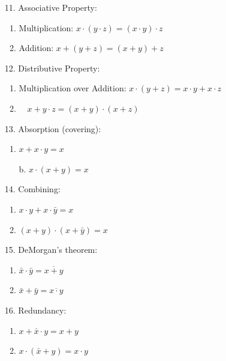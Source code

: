 \documentclass[12pt,openany, tikz,border=10pt]{book}
\begin{document}
\begin{multicols}{2}
\begin{enumerate}
			      			\item[11.] Associative Property:
			      			      \begin{enumerate}
			      			      	\item Multiplication: \( x \cdot (y \cdot z) = (x \cdot y) \cdot z \)
			      			      	\item Addition: \( x + (y + z) = (x + y) + z \)
			      			      \end{enumerate}
			      			\item[12.] Distributive Property:
			      			      \begin{enumerate}
			      			      	\item Multiplication over Addition: \( x \cdot (y + z) = x \cdot y + x \cdot z \)
			      			      	\item $\quad x + y \cdot z = (x + y) \cdot (x + z)$
			      			      \end{enumerate}
			      			\item[13.] Absorption (covering):
			      			      \begin{enumerate}
			      			      	\item $x + x \cdot y = x$
			      			      	\item[b.] $x \cdot (x + y) = x$
			      			      \end{enumerate}
			      			\item[14.] Combining:
			      			      \begin{enumerate}
			      			      	\item $x \cdot y + x \cdot \bar{y} = x$
			      			      	\item $(x + y) \cdot (x + \bar{y}) = x$ 
			      			      \end{enumerate}
			      			      \vspace*{20px}
			      			\item[15.] DeMorgan's theorem:
			      			      \begin{enumerate}
			      			      	\item $\bar{x} \cdot \bar{y} = \overline{x + y}$
			      			      	\item $\bar{x} + \bar{y} = \overline{x \cdot y}$
			      			      \end{enumerate}
			      			\item[16.] Redundancy:
			      			      \begin{enumerate}
			      			      	\item $x + \bar{x} \cdot y = x + y$
			      			      	\item $x \cdot (\bar{x} + y) = x \cdot y$

\end{enumerate}
\end{enumerate}
\end{multicols}
\end{document}
